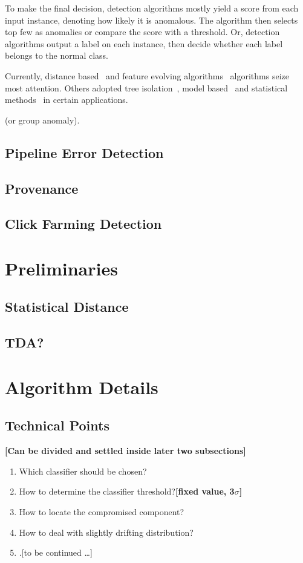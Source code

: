 \documentclass[a4paper]{IEEEtran}
\begin{document}
			To make the final decision, detection algorithms mostly yield a score from each input instance, denoting how likely it is anomalous. The algorithm then selects top few as anomalies or compare the score with a threshold. Or, detection algorithms output a label on each instance, then decide whether each label belongs to the normal class.
			
			Currently, distance based~\cite{cao2014scalable,cao2017multi} and feature evolving algorithms~\cite{masud2013classification,li2015discovery,shao2014prototype} algorithms seize most attention. Others adopted tree isolation~\cite{zhang2017lshiforest}, model based~\cite{yin2016model} and statistical methods~\cite{zhu2002statstream} in certain applications.
			
			(or group anomaly)\cite{yu2015glad}.
		
		\subsection{Pipeline Error Detection}
		
		\subsection{Provenance}
		
		\subsection{Click Farming Detection}
	
	\section{Preliminaries}\label{sec:preliminaries}
		\subsection{Statistical Distance}
		
		\subsection{TDA?}
	
	\section{Algorithm Details}\label{sec:algorithm-details}
		\subsection{Technical Points}
			\textbf{[Can be divided and settled inside later two subsections]}
			\begin{enumerate}
				\item Which classifier should be chosen?
				\item How to determine the classifier threshold?\textbf{[fixed value, 3$\sigma$]}
				\item How to locate the compromised component?
				\item How to deal with slightly drifting distribution?
				\item .[to be continued \dots]
			\end{enumerate}
			
\end{document}
